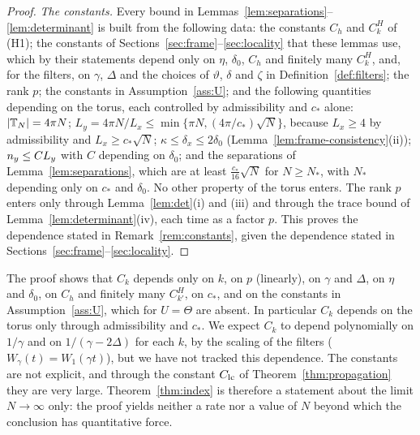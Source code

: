\begin{proof}
\emph{The constants.} Every bound in Lemmas~\ref{lem:separations}--\ref{lem:determinant} is built from the following
data: the constants $C_h$ and $C^H_k$ of (H1); the constants of Sections~\ref{sec:frame}--\ref{sec:locality} that these
lemmas use, which by their statements depend only on $\eta$, $\delta_0$, $C_h$ and finitely many $C^H_k$, and, for the
filters, on $\gamma$, $\Delta$ and the choices of $\vartheta$, $\delta$ and $\zeta$ in Definition~\ref{def:filters}; the rank $p$;
the constants in Assumption~\ref{ass:U}; and the following quantities depending on the torus, each controlled by
admissibility and $c_*$ alone: $\lvert\mathbb{T}_N\rvert=4\pi N$; $L_y=4\pi N/L_x\le\min\{\pi N,(4\pi/c_*)\sqrt N\}$, because $L_x\ge4$ by
admissibility and $L_x\ge c_*\sqrt N$; $\kappa\le\delta_x\le2\delta_0$ (Lemma~\ref{lem:frame-consistency}(ii)); $n_y\le CL_y$ with
$C$ depending on $\delta_0$; and the separations of Lemma~\ref{lem:separations}, which are at least $\frac{c_*}{16}\sqrt N$
for $N\ge N_*$, with $N_*$ depending only on $c_*$ and $\delta_0$. No other property of the torus enters. The rank $p$
enters only through Lemma~\ref{lem:det}(i) and (iii) and through the trace bound of Lemma~\ref{lem:determinant}(iv), each
time as a factor $p$. This proves the dependence stated in Remark~\ref{rem:constants}, given the dependence stated in
Sections~\ref{sec:frame}--\ref{sec:locality}.
\end{proof}

\begin{remark}\label{rem:constants}
The proof shows that $C_k$ depends only on $k$, on $p$ (linearly), on $\gamma$ and $\Delta$, on $\eta$ and $\delta_0$, on
$C_h$ and finitely many $C^H_{k'}$, on $c_*$, and on the constants in Assumption~\ref{ass:U}, which for $U=\Theta$ are
absent. In particular $C_k$ depends on the torus only through admissibility and $c_*$. We expect $C_k$ to depend
polynomially on $1/\gamma$ and on $1/(\gamma-2\Delta)$ for each $k$, by the scaling of the filters
($W_\gamma(t)=W_1(\gamma t)$), but we have not tracked this dependence. The constants are not explicit, and through
the constant $C_{\rm lc}$ of Theorem~\ref{thm:propagation} they are very large. Theorem~\ref{thm:index} is therefore a
statement about the limit $N\to\infty$ only: the proof yields neither a rate nor a value of $N$ beyond which
the conclusion has quantitative force.
\end{remark}

